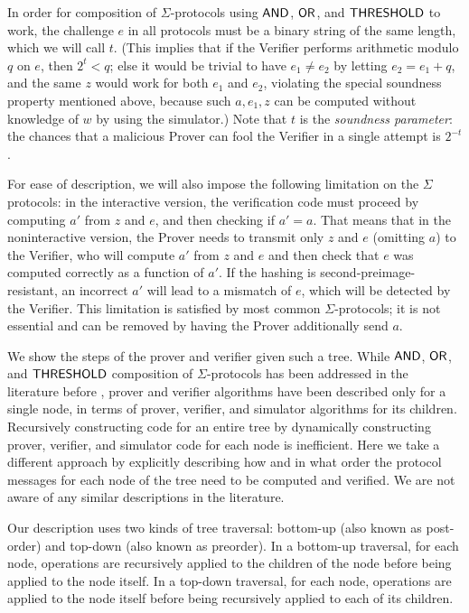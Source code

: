 \documentclass[11pt]{llncs}
\begin{document}
In order for composition of $\Sigma$-protocols using $\mathsf{AND}$, $\mathsf{OR}$, and $\mathsf{THRESHOLD}$ to work, the challenge $e$ in all protocols must be a binary string of the same length, which we will call $t$.  (This implies that if the Verifier performs arithmetic modulo $q$ on $e$, then $2^t<q$; else it would be trivial to have $e_1\neq e_2$ by letting $e_2=e_1+q$, and the same $z$ would work for both $e_1$ and $e_2$, violating the special soundness property mentioned above, because such $a, e_1, z$ can be computed without knowledge of $w$ by using the simulator.)  Note that $t$ is the \emph{soundness parameter}: the chances that a malicious Prover can fool the Verifier in a single attempt is $2^{-t}$. 

 For ease of description, we will also impose the following limitation on the $\Sigma$ protocols: in the interactive version, the verification code must proceed by computing $a'$ from $z$ and $e$, and then checking if $a'=a$. That means that in the noninteractive version, the Prover needs to transmit only $z$ and $e$ (omitting $a$) to the Verifier, who will compute $a'$ from $z$ and $e$ and then check that $e$ was computed correctly as a function of $a'$. If the hashing is second-preimage-resistant, an incorrect $a'$ will lead to a mismatch of $e$, which will be detected by the Verifier. This limitation is satisfied by most common $\Sigma$-protocols; it is not essential and can be removed by having the Prover additionally send $a$.

We show the steps of the prover and verifier given such a tree. While $\mathsf{AND}$, $\mathsf{OR}$, and $\mathsf{THRESHOLD}$ composition of $\Sigma$-protocols has been addressed in the literature before \cite{CDS94}, prover and verifier algorithms have been described only for a single node, in terms of prover, verifier, and simulator algorithms for its children. Recursively constructing code for an entire tree by dynamically constructing prover, verifier, and simulator code for each node is inefficient. Here we take a different approach by explicitly describing how and in what order the protocol messages for each node of the tree need to be computed and verified. We are not aware of any similar descriptions in the literature.

Our description uses two kinds of tree traversal: bottom-up (also known as post-order) and top-down (also known as preorder). In a bottom-up traversal, for each node, operations are recursively applied to the children of the node before being applied to the node itself. In a top-down traversal, for each node, operations are applied to the node itself before being recursively applied to each of its children.
\end{document}

